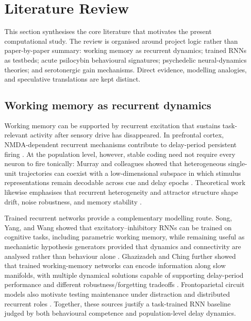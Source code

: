 \section{Literature Review}
\label{ch:literature}

This section synthesises the core literature that motivates the present
computational study. The review is organised around project logic rather than
paper-by-paper summary: working memory as recurrent dynamics; trained RNNs as
testbeds; acute psilocybin behavioural signatures; psychedelic neural-dynamics
theories; and serotonergic gain mechanisms. Direct evidence, modelling
analogies, and speculative translations are kept distinct.

\subsection{Working memory as recurrent dynamics}

Working memory can be supported by recurrent excitation that sustains
task-relevant activity after sensory drive has disappeared. In prefrontal
cortex, NMDA-dependent recurrent mechanisms contribute to delay-period
persistent firing \cite{wang2013nmda}. At the population level, however,
stable coding need not require every neuron to fire tonically: Murray and
colleagues showed that heterogeneous single-unit trajectories can coexist with
a low-dimensional subspace in which stimulus representations remain decodable
across cue and delay epochs \cite{murray2017stable}. Theoretical work likewise
emphasises that recurrent heterogeneity and attractor structure shape drift,
noise robustness, and memory stability \cite{kilpatrick2013}.

Trained recurrent networks provide a complementary modelling route. Song,
Yang, and Wang showed that excitatory--inhibitory RNNs can be trained on
cognitive tasks, including parametric working memory, while remaining useful
as mechanistic hypothesis generators provided that dynamics and connectivity
are analysed rather than behaviour alone \cite{song2016ei}. Ghazizadeh and
Ching further showed that trained working-memory networks can encode
information along slow manifolds, with multiple dynamical solutions capable of
supporting delay-period performance and different robustness/forgetting
tradeoffs \cite{ghazizadeh2021}. Frontoparietal circuit models also motivate
testing maintenance under distraction and distributed recurrent roles
\cite{murray2017frontoparietal}. Together, these sources justify a
task-trained RNN baseline judged by both behavioural competence and
population-level delay dynamics.

